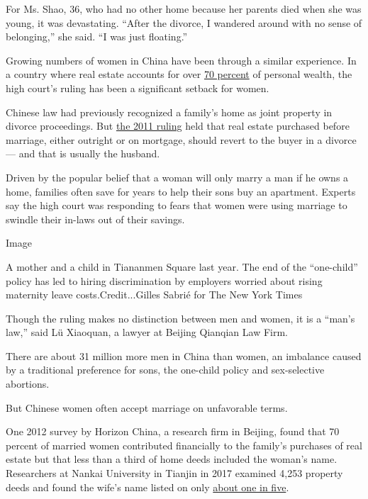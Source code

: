 For Ms. Shao, 36, who had no other home because her parents died when
she was young, it was devastating. ``After the divorce, I wandered
around with no sense of belonging,'' she said. ``I was just floating.''

Growing numbers of women in China have been through a similar
experience. In a country where real estate accounts for over
\href{https://www.ncbi.nlm.nih.gov/pmc/articles/PMC4589866/}{70 percent}
of personal wealth, the high court's ruling has been a significant
setback for women.

Chinese law had previously recognized a family's home as joint property
in divorce proceedings. But
\href{https://www.nytimes3xbfgragh.onion/2011/09/08/world/asia/08iht-letter08.html}{the
2011 ruling} held that real estate purchased before marriage, either
outright or on mortgage, should revert to the buyer in a divorce --- and
that is usually the husband.

Driven by the popular belief that a woman will only marry a man if he
owns a home, families often save for years to help their sons buy an
apartment. Experts say the high court was responding to fears that women
were using marriage to swindle their in-laws out of their savings.

Image

A mother and a child in Tiananmen Square last year. The end of the
``one-child'' policy has led to hiring discrimination by employers
worried about rising maternity leave costs.Credit...Gilles Sabrié for
The New York Times

Though the ruling makes no distinction between men and women, it is a
``man's law,'' said Lü Xiaoquan, a lawyer at Beijing Qianqian Law Firm.

There are about 31 million more men in China than women, an imbalance
caused by a traditional preference for sons, the one-child policy and
sex-selective abortions.

But Chinese women often accept marriage on unfavorable terms.

One 2012 survey by Horizon China, a research firm in Beijing, found that
70 percent of married women contributed financially to the family's
purchases of real estate but that less than a third of home deeds
included the woman's name. Researchers at Nankai University in Tianjin
in 2017 examined 4,253 property deeds and found the wife's name listed
on only
\href{https://www.academia.edu/35082071/_and_ldquo_\%E6\%88\%BF\%E4\%BA\%A7\%E8\%AF\%81\%E4\%B8\%8A\%E7\%9A\%84\%E7\%88\%B1\%E6\%83\%85_and_quot_and_mdash_and_mdash_and_mdash_\%E5\%A9\%9A\%E5\%A7\%BB\%E5\%B8\%82\%E5\%9C\%BA\%E4\%B8\%8E\%E5\%AE\%B6\%E5\%BA\%AD\%E6\%88\%BF\%E4\%BA\%A7\%E4\%BA\%A7\%E6\%9D\%83\%E5\%88\%86\%E5\%B8\%83}{about
one in five}.

